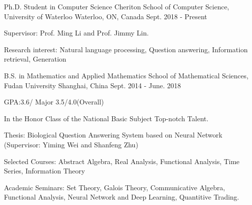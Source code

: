 

\begin{cventries}

 \cventry
    {Ph.D. Student in Computer Science} %
    {Cheriton School of Computer Science, University of Waterloo} %
    {Waterloo, ON, Canada} %
    {Sept. 2018 - Present} %
    {
      \begin{cvitems} %
        \item {Supervisor: Prof. Ming Li and Prof. Jimmy Lin.}
        \item {Research interest: Natural language processing, Question answering, Information retrieval, Generation }
      \end{cvitems}
    }
      \cventry
    {B.S. in Mathematics and Applied Mathematics} %
    {School of Mathematical Sciences, Fudan University} %
    {Shanghai, China} %
    {Sept. 2014 - June. 2018} %
    {
      \begin{cvitems} %
      \item{GPA:3.6/ Major 3.5/4.0(Overall)}
      \item {In the Honor Class of the National Basic Subject Top-notch Talent.}
      \item{Thesis: Biological Question Answering System based on Neural Network (Supervisor: Yiming Wei and Shanfeng Zhu)}
      \item{Selected Courses: Abstract Algebra, Real Analysis, Functional Analysis, Time Series, Information Theory}
      \item{Academic Seminars: Set Theory, Galois Theory, Communicative Algebra, Functional Analysis, Neural Network and Deep Learning, Quantitive Trading.}
      \end{cvitems}
    }

\end{cventries}
